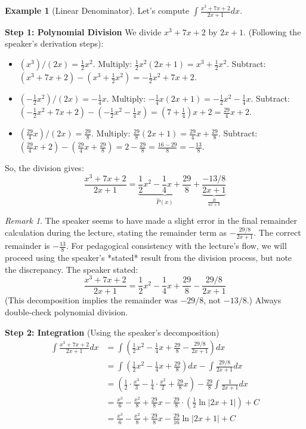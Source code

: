 \documentclass[11pt]{article}
\theoremstyle{plain}
\theoremstyle{definition}
\newtheorem{example}[theorem]{Example}
\theoremstyle{remark}
\newtheorem{remark}[theorem]{Remark}
\newcommand{\abs}[1]{\left|#1\right|}
\begin{document}
\begin{example}[Linear Denominator]
Let's compute $\int \frac{x^3 + 7x + 2}{2x+1} dx$.

\textbf{Step 1: Polynomial Division}
We divide $x^3 + 7x + 2$ by $2x+1$.
(Following the speaker's derivation steps):
\begin{itemize}
    \item $(x^3) / (2x) = \frac{1}{2}x^2$. Multiply: $\frac{1}{2}x^2 (2x+1) = x^3 + \frac{1}{2}x^2$. Subtract: $(x^3+7x+2) - (x^3+\frac{1}{2}x^2) = -\frac{1}{2}x^2 + 7x + 2$.
    \item $(-\frac{1}{2}x^2) / (2x) = -\frac{1}{4}x$. Multiply: $-\frac{1}{4}x(2x+1) = -\frac{1}{2}x^2 - \frac{1}{4}x$. Subtract: $(-\frac{1}{2}x^2+7x+2) - (-\frac{1}{2}x^2 - \frac{1}{4}x) = (7+\frac{1}{4})x + 2 = \frac{29}{4}x + 2$.
    \item $(\frac{29}{4}x) / (2x) = \frac{29}{8}$. Multiply: $\frac{29}{8}(2x+1) = \frac{29}{4}x + \frac{29}{8}$. Subtract: $(\frac{29}{4}x+2) - (\frac{29}{4}x + \frac{29}{8}) = 2 - \frac{29}{8} = \frac{16-29}{8} = -\frac{13}{8}$.
\end{itemize}
So, the division gives:
\[ \frac{x^3 + 7x + 2}{2x+1} = \underbrace{\frac{1}{2}x^2 - \frac{1}{4}x + \frac{29}{8}}_{\hat{P}(x)} + \underbrace{\frac{-13/8}{2x+1}}_{\frac{R}{ax+b}} \]
\begin{remark}
The speaker seems to have made a slight error in the final remainder calculation during the lecture, stating the remainder term as $-\frac{29/8}{2x+1}$. The correct remainder is $-\frac{13}{8}$. For pedagogical consistency with the lecture's flow, we will proceed using the speaker's *stated* result from the division process, but note the discrepancy. The speaker stated:
\[ \frac{x^3 + 7x + 2}{2x+1} = \frac{1}{2}x^2 - \frac{1}{4}x + \frac{29}{8} - \frac{29/8}{2x+1} \]
(This decomposition implies the remainder was $-29/8$, not $-13/8$.) Always double-check polynomial division.
\end{remark}

\textbf{Step 2: Integration} (Using the speaker's decomposition)
\begin{align*} \int \frac{x^3 + 7x + 2}{2x+1} dx &= \int \left( \frac{1}{2}x^2 - \frac{1}{4}x + \frac{29}{8} - \frac{29/8}{2x+1} \right) dx \\ &= \int \left( \frac{1}{2}x^2 - \frac{1}{4}x + \frac{29}{8} \right) dx - \int \frac{29/8}{2x+1} dx \\ &= \left( \frac{1}{2} \cdot \frac{x^3}{3} - \frac{1}{4} \cdot \frac{x^2}{2} + \frac{29}{8}x \right) - \frac{29}{8} \int \frac{1}{2x+1} dx \\ &= \frac{x^3}{6} - \frac{x^2}{8} + \frac{29}{8}x - \frac{29}{8} \cdot \left( \frac{1}{2} \ln\abs{2x+1} \right) + C \\ &= \frac{x^3}{6} - \frac{x^2}{8} + \frac{29}{8}x - \frac{29}{16} \ln\abs{2x+1} + C \end{align*}
\end{example}
\end{document}

